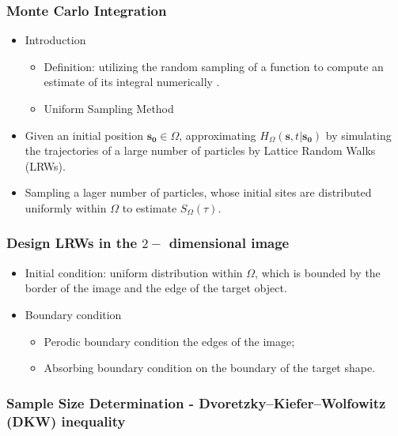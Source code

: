       \subsubsection{Monte Carlo Integration}
        \begin{itemize}
           \item Introduction
             \begin{itemize}
               \item Definition: utilizing the random sampling of a function to compute an estimate of its integral numerically \cite{hammersley1960monte}.
               \item Uniform Sampling Method
             \end{itemize}
           \item Given an initial position $\bm{s_0} \in \Omega$, approximating $H_{\Omega}(\bm{s}, t | \bm{s_0})$ by simulating the trajectories of a large number of particles by Lattice Random Walks (LRWs).
           \item Sampling a lager number of particles, whose initial sites are distributed uniformly within $\Omega$ to estimate $S_{\Omega}(\tau)$.
        \end{itemize}
        
     \subsubsection{Design LRWs in the $2-$ dimensional image}
       \begin{itemize}
           \item Initial condition: uniform distribution within $\Omega$, which is bounded by the border of the image and the edge of the target object.
           \item Boundary condition
             \begin{itemize}
               \item Perodic boundary condition the edges of the image;
               \item Absorbing boundary condition on the boundary of the target shape.
             \end{itemize}
       \end{itemize}
       
        

      \subsubsection{Sample Size Determination - Dvoretzky–Kiefer–Wolfowitz (DKW) inequality \cite{dvoretzky1956asymptotic}}

